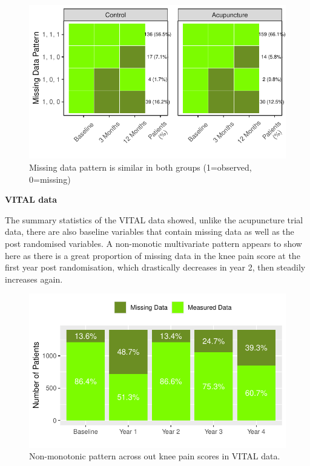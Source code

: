 \documentclass{article}
\newcommand{\pandocbounded}[1]{#1}
\begin{document}
\begin{figure}
\centering
\pandocbounded{\includegraphics[keepaspectratio]{Final_Report_files/figure-latex/unnamed-chunk-20-1.pdf}}
\caption{Missing data pattern is similar in both groups (1=observed,
0=missing)}
\end{figure}

\textbf{VITAL data}

The summary statistics of the VITAL data showed, unlike the acupuncture
trial data, there are also baseline variables that contain missing data
as well as the post randomised variables. A non-monotic multivariate
pattern appears to show here as there is a great proportion of missing
data in the knee pain score at the first year post randomisation, which
drastically decreases in year 2, then steadily increases again.

\begin{figure}

{\centering \includegraphics{Final_Report_files/figure-latex/unnamed-chunk-21-1} 

}

\caption{Non-monotonic pattern across out knee pain scores in VITAL data.}\label{fig:unnamed-chunk-21}
\end{figure}
\end{document}

